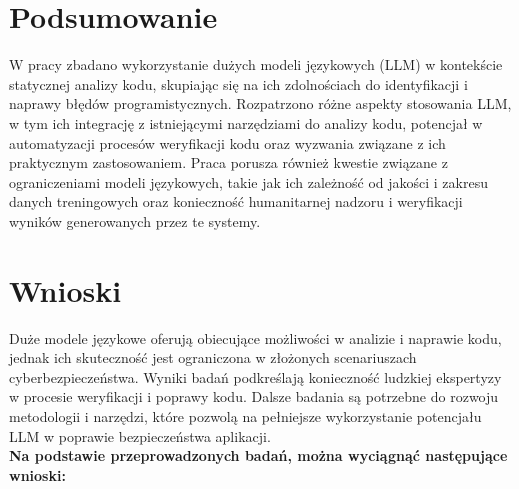

\section*{Podsumowanie}
W pracy zbadano wykorzystanie dużych modeli językowych (LLM) w kontekście statycznej analizy kodu, skupiając się na ich zdolnościach do identyfikacji i naprawy błędów programistycznych. Rozpatrzono różne aspekty stosowania LLM, w tym ich integrację z istniejącymi narzędziami do analizy kodu, potencjał w automatyzacji procesów weryfikacji kodu oraz wyzwania związane z ich praktycznym zastosowaniem. Praca porusza również kwestie związane z ograniczeniami modeli językowych, takie jak ich zależność od jakości i zakresu danych treningowych oraz konieczność humanitarnej nadzoru i weryfikacji wyników generowanych przez te systemy.

\section*{Wnioski}
Duże modele językowe oferują obiecujące możliwości w analizie i naprawie kodu, jednak ich skuteczność jest ograniczona w złożonych scenariuszach cyberbezpieczeństwa. Wyniki badań podkreślają konieczność ludzkiej ekspertyzy w procesie weryfikacji i poprawy kodu. Dalsze badania są potrzebne do rozwoju metodologii i narzędzi, które pozwolą na pełniejsze wykorzystanie potencjału LLM w poprawie bezpieczeństwa aplikacji. 
\\
\textbf{Na podstawie przeprowadzonych badań, można wyciągnąć następujące wnioski:}

